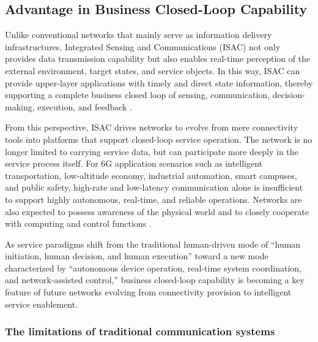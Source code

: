 \subsection{Advantage in Business Closed-Loop Capability}
\label{subsec:ch1-isac-core value-closed loop}

Unlike conventional networks that mainly serve as information delivery infrastructures, Integrated Sensing and Communications (ISAC) not only provides data transmission capability but also enables real-time perception of the external environment, target states, and service objects. In this way, ISAC can provide upper-layer applications with timely and direct state information, thereby supporting a complete business closed loop of sensing, communication, decision-making, execution, and feedback \cite{Liu2022ISAC, Zhang2021ISAC6G, ITU2030, IMT2030Framework}.

From this perspective, ISAC drives networks to evolve from mere connectivity tools into platforms that support closed-loop service operation. The network is no longer limited to carrying service data, but can participate more deeply in the service process itself. For 6G application scenarios such as intelligent transportation, low-altitude economy, industrial automation, smart campuses, and public safety, high-rate and low-latency communication alone is insufficient to support highly autonomous, real-time, and reliable operations. Networks are also expected to possess awareness of the physical world and to closely cooperate with computing and control functions \cite{Letaief2019Roadmap, Saad2020Vision6G, ITU2030}.

As service paradigms shift from the traditional human-driven mode of “human initiation, human decision, and human execution” toward a new mode characterized by “autonomous device operation, real-time system coordination, and network-assisted control,” business closed-loop capability is becoming a key feature of future networks evolving from connectivity provision to intelligent service enablement.

\subsubsection{The limitations of traditional communication systems}
\label{subsubsec:ch1-isac-core value-closed loop-communication}

